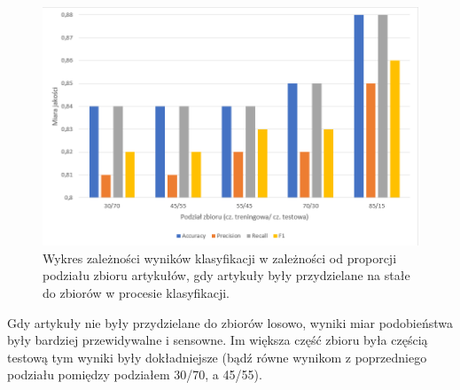 \documentclass{classrep}
\begin{document}
\begin{figure}[H]
    \centering
    \includegraphics[width=14cm]{ranges_const_bar_chart.png}
    \caption{Wykres zależności wyników klasyfikacji w zależności od proporcji podziału zbioru artykułów, gdy artykuły były przydzielane na stałe do zbiorów w procesie klasyfikacji.}
    \label{wykres:proporcja_stale}
\end{figure}


Gdy artykuły nie były przydzielane do zbiorów losowo, wyniki miar podobieństwa były bardziej przewidywalne i sensowne. Im większa część zbioru była częścią testową tym wyniki były dokładniejsze (bądź równe wynikom z poprzedniego podziału pomiędzy podziałem 30/70, a 45/55).
\end{document}
